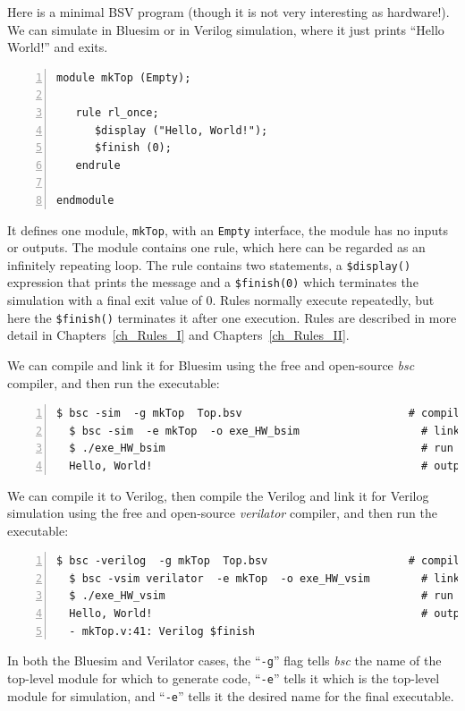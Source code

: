 Here is a minimal BSV program (though it is not very interesting as
hardware!).  We can simulate in Bluesim or in Verilog simulation,
where it just prints ``Hello World!'' and exits.

{\small
\begin{Verbatim}[frame=single, numbers=left, label=in file Ex\_04\_01/Top.bsv]
module mkTop (Empty);

   rule rl_once;
      $display ("Hello, World!");
      $finish (0);
   endrule
      
endmodule
\end{Verbatim}
}

It defines one module, \verb|mkTop|, with an \verb|Empty| interface,
{\ie} the module has no inputs or outputs.  The module contains one
rule, which here can be regarded as an infinitely repeating loop.  The
rule contains two statements, a \verb|$display()| expression that
prints the message and a \verb|$finish(0)| which terminates the
simulation with a final exit value of 0.  Rules normally execute
repeatedly, but here the \verb|$finish()| terminates it after one
execution. Rules are described in more detail in
Chapters~\ref{ch_Rules_I} and Chapters~\ref{ch_Rules_II}.

We can compile and link it for Bluesim using the free and open-source
\emph{bsc} compiler, and then run the executable:

{\small
\begin{Verbatim}[frame=single, numbers=left]
  $ bsc -sim  -g mkTop  Top.bsv                          # compile
  $ bsc -sim  -e mkTop  -o exe_HW_bsim                   # link
  $ ./exe_HW_bsim                                        # run
  Hello, World!                                          # output
\end{Verbatim}
}

We can compile it to Verilog, then compile the Verilog and link it for
Verilog simulation using the free and open-source \emph{verilator}
compiler, and then run the executable:

{\small
\begin{Verbatim}[frame=single, numbers=left]
  $ bsc -verilog  -g mkTop  Top.bsv                      # compile -> mkTop.v
  $ bsc -vsim verilator  -e mkTop  -o exe_HW_vsim        # link
  $ ./exe_HW_vsim                                        # run
  Hello, World!                                          # output
  - mkTop.v:41: Verilog $finish
\end{Verbatim}
}

In both the Bluesim and Verilator cases, the ``\verb|-g|'' flag tells
\emph{bsc} the name of the top-level module for which to generate
code, ``\verb|-e|'' tells it which is the top-level module for
simulation, and ``\verb|-e|'' tells it the desired name for the final
executable.

